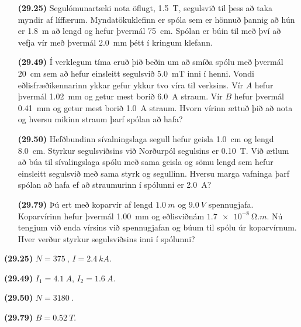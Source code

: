 \ifdefined \wholebook \else\documentclass[oneside]{book}\usepackage{EdlBook}\graphicspath{{figures/}}
\begin{document}
\begin{enumerate}[label = \textbf{(\alph*)}]

\item[\textbf{(29.25)}] Segulómunartæki nota öflugt, \SI{1.5}{T}, segulsvið til þess að taka myndir af líffærum. Myndatökuklefinn er spóla sem er hönnuð þannig að hún er \SI{1.8}{m} að lengd og hefur þvermál \SI{75}{cm}. Spólan er búin til með því að vefja vír með þvermál \SI{2.0}{mm} þétt í kringum klefann. 

\item[\textbf{(29.49)}] Í verklegum tíma eruð þið beðin um að smíða spólu með þvermál \SI{20}{cm} sem að hefur einsleitt segulsvið \SI{5.0}{mT} inni í henni. Vondi eðlisfræðikennarinn ykkar gefur ykkur tvo víra til verksins. Vír $A$ hefur þvermál \SI{1.02}{mm} og getur mest borið \SI{6.0}{A} straum. Vír $B$ hefur þvermál \SI{0.41}{mm} og getur mest borið \SI{1.0}{A} straum. Hvorn vírinn ættuð þið að nota og hversu mikinn straum þarf spólan að hafa?

\item[\textbf{(29.50)}] Hefðbundinn sívalningslaga segull hefur geisla \SI{1.0}{cm} og lengd \SI{8.0}{cm}. Styrkur segulsviðsins við Norðurpól segulsins er \SI{0.10}{T}. Við ætlum að búa til sívalingslaga spólu með sama geisla og sömu lengd sem hefur einsleitt segulsvið með sama styrk og segullinn. Hversu marga vafninga þarf spólan að hafa ef að straumurinn í spólunni er \SI{2.0}{A}?

\item[\textbf{(29.79)}] Þú ert með koparvír af lengd $\SI{1.0}{m}$ og $\SI{9.0}{V}$ spennugjafa. Koparvírinn hefur þvermál \SI{1.00}{mm} og eðlisviðnám $\SI{1.7e-8}{\ohm.m}$. Nú tengjum við enda vírsins við spennugjafan og búum til spólu úr koparvírnum. Hver verður styrkur segulsviðsins inni í spólunni?


\end{enumerate}


\begin{tcolorbox}
\begin{enumerate*}[label = ]
  \item \textbf{(29.25)} $N = \SI{375}{}$, $I = \SI{2.4}{kA}$.
  \item \textbf{(29.49)} $I_1 = \SI{4.1}{A}$, $I_2 = \SI{1.6}{A}$.
  \item \textbf{(29.50)} $N = \SI{3180}{}$. \\
  \item \textbf{(29.79)} $B = \SI{0.52}{T}$.
\end{enumerate*}
\end{tcolorbox}

\newpage









\ifdefined \wholebook \else
 \printindex
\end{document}
